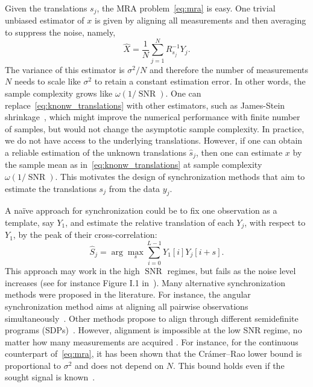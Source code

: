\documentclass{IEEEtran}
\numberwithin{equation}{section}
\numberwithin{figure}{section}
\theoremstyle{plain}
\theoremstyle{definition}
\theoremstyle{remark}
\theoremstyle{plain}
\theoremstyle{remark}
\theoremstyle{plain}
\theoremstyle{plain}
\theoremstyle{remark}
\newcommand{\SNR}{\operatorname{SNR}}
\begin{document}
Given the translations $s_j$, the MRA problem~\eqref{eq:mra} is easy. One trivial unbiased estimator of $x$ is given by aligning all measurements and then averaging to suppress the noise, namely,
%
\begin{equation} \label{eq:knonw_translations}
%
    \widehat{X} = \frac{1}{N}\sum_{j=1}^NR_{s_j}^{-1}Y_j.
%
\end{equation} 
%
The variance of this estimator is $\sigma^2/N$ and therefore the number of measurements $N$ needs to scale like $\sigma^2$ to retain a constant estimation error. In other words, the sample complexity grows like $\omega(1/\SNR)$. One can replace~\eqref{eq:knonw_translations} with other estimators, such as James-Stein shrinkage~\cite{james1961estimation,efron1973stein,efron1975data}, which might improve the numerical performance with finite number of samples, but would not change the asymptotic sample complexity.
In practice, we do not have access to the underlying translations. However, if one can obtain a reliable estimation of the unknown translations ${\hat{s}_j}$, then one can estimate $x$ by the sample mean as in~\eqref{eq:knonw_translations} at sample complexity $\omega(1/\SNR)$. This motivates the design of synchronization methods that aim to estimate the translations $s_j$ from the data $y_j$.

A na\"ive approach for synchronization could be to fix one observation as a template, say $Y_1$, and estimate the relative translation of each $Y_j$, with respect to $Y_1$, by the peak of their cross-correlation:
\begin{equation*}
\hat{S}_j = \arg\max_s \sum_{i=0}^{L-1}Y_1[i]Y_j[i+s].
\end{equation*}
This approach may work in the high $\SNR$ regimes, but fails as the noise level increases (see for instance Figure I.1 in~\cite{bendory2017bispectrum}). 
Many alternative synchronization methods were proposed in the literature. For instance, the angular synchronization method aims at aligning all pairwise observations simultaneously~\cite{singer2011angular,boumal2016nonconvex,perry2018message,chen2018projected,bandeira2014tightness,zhong2018near}. Other methods propose to align through different semidefinite programs (SDPs)~\cite{bandeira2015non,bandeira2014multireference,chen2014near,bandeira2016low}. However, alignment is impossible at the low SNR regime, no matter how many measurements are acquired \cite{bendory2018toward}. For instance, for the continuous counterpart of~\eqref{eq:mra}, it has been shown that the Cr\'amer--Rao lower bound is proportional to $\sigma^2$ and does not depend on $N$. This bound holds even if the sought signal is known~\cite{aguerrebere2016fundamental}.
\end{document}
